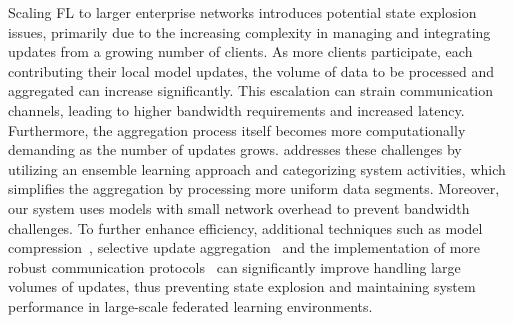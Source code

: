Scaling FL to larger enterprise networks introduces potential state explosion issues, primarily due to the increasing complexity in managing and integrating updates from a growing number of clients. As more clients participate, each contributing their local model updates, the volume of data to be processed and aggregated can increase significantly. This escalation can strain communication channels, leading to higher bandwidth requirements and increased latency. Furthermore, the aggregation process itself becomes more computationally demanding as the number of updates grows. \Sys addresses these challenges by utilizing an ensemble learning approach and categorizing system activities, which simplifies the aggregation by processing more uniform data segments. Moreover, our system uses models with small network overhead to prevent bandwidth challenges. To further enhance efficiency, additional techniques such as model compression~\cite{choudhary2020comprehensive}, selective update aggregation~\cite{ye2020federated} and the implementation of more robust communication protocols~\cite{laclau2020robust} can significantly improve handling large volumes of updates, thus preventing state explosion and maintaining system performance in large-scale federated learning environments.







